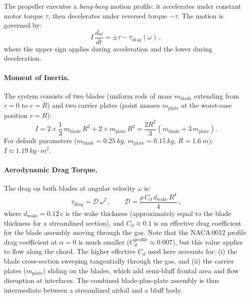\documentclass[11pt,a4paper]{article}
\begin{document}
The propeller executes a \emph{bang-bang} motion profile: it accelerates
under constant motor torque $\tau$, then decelerates under reversed
torque $-\tau$. The motion is governed by:
\begin{equation}
  I\,\frac{d\omega}{dt} = \pm\tau - \tau_\mathrm{drag}(\omega)\,,
  \label{eq:EOM}
\end{equation}
where the upper sign applies during acceleration and the lower during
deceleration.

\paragraph{Moment of Inertia.}
The system consists of two blades (uniform rods of mass $m_\mathrm{blade}$
extending from $r = 0$ to $r = R$) and two carrier plates (point masses
$m_\mathrm{plate}$ at the worst-case position $r = R$):
\begin{equation}
  I = 2 \times \frac{1}{3}\,m_\mathrm{blade}\,R^2
    + 2 \times m_\mathrm{plate}\,R^2
    = \frac{2R^2}{3}\left(m_\mathrm{blade} + 3\,m_\mathrm{plate}\right).
  \label{eq:I}
\end{equation}
For default parameters ($m_\mathrm{blade} = \SI{0.25}{kg}$,
$m_\mathrm{plate} = \SI{0.15}{kg}$, $R = \SI{1.6}{m}$):
$I \approx \SI{1.19}{kg\cdot m^2}$.

\paragraph{Aerodynamic Drag Torque.}
The drag on both blades at angular velocity $\omega$ is:
\begin{equation}
  \tau_\mathrm{drag} = \mathcal{D}\,\omega^2\,,
  \qquad
  \mathcal{D} = \frac{\rho\, C_d\, d_\mathrm{wake}\, R^4}{4}\,,
  \label{eq:tau_drag}
\end{equation}
where $d_\mathrm{wake} = 0.12\,c$ is the wake thickness (approximately
equal to the blade thickness for a streamlined section), and
$C_d \approx 0.1$ is an effective drag coefficient for the
blade assembly moving through the gas. Note that the NACA\,0012 profile
drag coefficient at $\alpha = 0$ is much smaller
($C_d^\mathrm{profile} \approx 0.007$), but this value applies to flow
along the chord. The higher effective $C_d$ used here accounts for:
(i) the blade cross-section sweeping tangentially through the gas, and
(ii) the carrier plates ($m_\mathrm{plate}$) sliding on the blades,
which add semi-bluff frontal area and flow disruption at interfaces.
The combined blade-plus-plate assembly is thus intermediate between
a streamlined airfoil and a bluff body.
\end{document}

